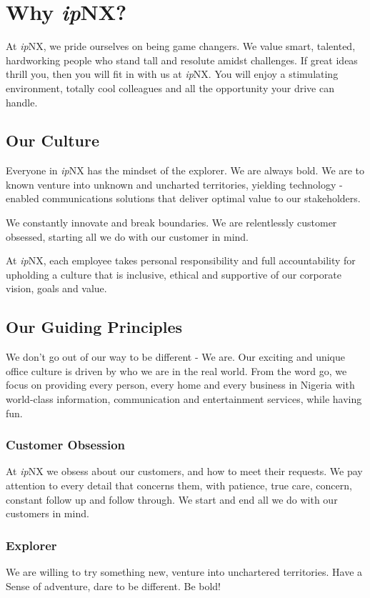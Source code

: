 \section{Why \textit{ip}NX?}
At \textit{ip}NX, we pride ourselves on being game changers. We value smart, talented, hardworking people who stand tall and resolute amidst challenges. If great ideas thrill you, then you will fit in with us at \textit{ip}NX. You will enjoy a stimulating environment, totally cool colleagues and all the opportunity your drive can handle.
\subsection{Our Culture}
Everyone in \textit{ip}NX has the mindset of the explorer. We are always bold. We are to known venture into unknown and uncharted territories, yielding technology - enabled communications solutions that deliver optimal value to our stakeholders.

We constantly innovate and break boundaries. We are relentlessly customer obsessed, starting all we do with our customer in mind.

At \textit{ip}NX, each employee takes personal responsibility and full accountability for upholding a culture that is inclusive, ethical and supportive of our corporate vision, goals and value.
\subsection{Our Guiding Principles}
We don't go out of our way to be different - We are. Our exciting and unique office culture is driven by who we are in the real world. From the word go, we focus on providing every person, every home and every business in Nigeria with world-class information, communication and entertainment services, while having fun.
\subsubsection{Customer Obsession} At \textit{ip}NX we obsess about our customers, and how to meet their requests.  We pay attention to every detail that concerns them, with patience, true care, concern, constant follow up and follow through. We start and end all we do with our customers in mind.
\subsubsection{Explorer} We are willing to try something new, venture into unchartered territories. Have a Sense of adventure, dare  to be different. Be bold!
